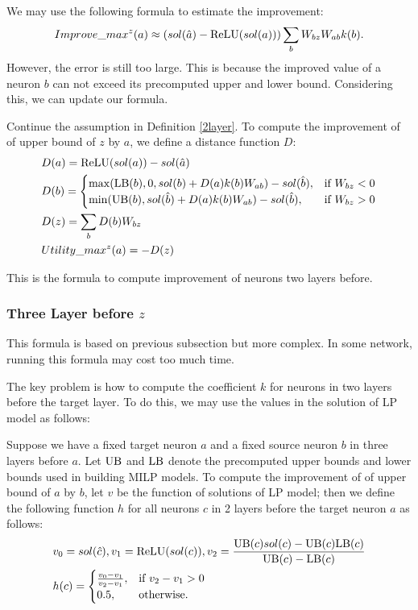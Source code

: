 We may use the following formula to estimate the improvement:  \begin{align*}
	Improve\_max^z(a) \approx (sol(\hat{a})-\mathrm{ReLU}(sol(a)))\sum_b W_{bz}W_{ab}k(b).
\end{align*}However, the error is still too large. This is because the improved value of a neuron $b$ can not exceed its precomputed upper and lower bound. Considering this, we can update our formula.

\begin{definition}
	Continue the assumption in Definition \ref{2layer}. To compute the improvement of of upper bound of $z$ by $a$, we define a distance function $D$:
	\begin{align}
		&D(a) = \mathrm{ReLU}(sol(a))-sol(\hat{a})\\
			&D(b) =
		\begin{cases}
			\max(\mathrm{LB}(b), 0, sol(b)+D(a)k(b)W_{ab})-sol(\hat{b}), & \text{if }W_{bz} < 0\\
			\min(\mathrm{UB}(b), sol(\hat{b})+D(a)k(b)W_{ab})-sol(\hat{b}), & \text{if }  W_{bz} > 0
		\end{cases}\\
		&D(z) = \sum_b D(b)W_{bz}\\
		&Utility\_max^z(a) = -D(z)
	\end{align}
\end{definition}
 This is the formula to compute improvement of neurons two layers before.


\subsubsection*{Three Layer before $z$} 

This formula is based on previous subsection but more complex. In some network, running this formula may cost too much time. 

The key problem is how to compute the coefficient $k$ for neurons in two layers before the target layer. To do this, we may use the values in the solution of LP model as follows:

\begin{definition}\label{3layer}
	Suppose we have a fixed target neuron $a$ and a fixed source neuron $b$ in three layers before $a$. Let $\mathrm{UB}$ and $\mathrm{LB}$ denote the precomputed upper bounds and lower bounds used in building MILP models. To compute the improvement of of upper bound of $a$ by $b$, let $v$ be the function of solutions of LP model; then we define the following function $h$ for all neurons $c$ in 2 layers before the target neuron $a$ as follows:
	\begin{align}
		&v_0 = sol(\hat{c}), v_1 = \mathrm{ReLU}(sol(c)), v_2 = \frac{\mathrm{UB}(c)sol(c)-\mathrm{UB}(c)\mathrm{LB}(c)}{\mathrm{UB}(c)-\mathrm{LB}(c)}\\
		&h(c) =
		\begin{cases}
			\frac{v_0-v_1}{v_2-v_1}, & \text{if } v_2-v_1 > 0\\
			0.5, & \text{otherwise.}
		\end{cases}
	\end{align} 
\end{definition} 

